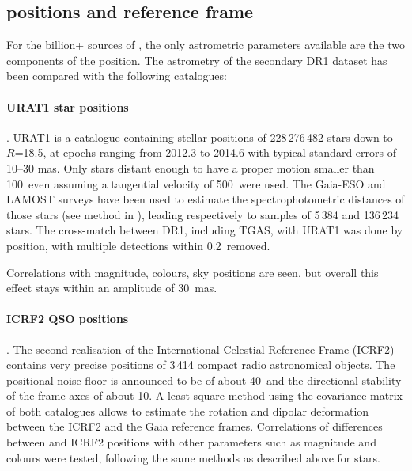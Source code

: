 \subsection{{} positions and reference frame}\label{sec:DR1pos}

For the billion+ sources of {}, the only astrometric parameters available are the two components of the position. The astrometry of the secondary DR1 dataset has been compared with the following catalogues:
 \paragraph{URAT1 star positions} \citep{urat1}. URAT1 is a catalogue containing stellar positions of 228\,276\,482 stars down to $R$=18.5, at epochs ranging from 2012.3 to 2014.6 with typical standard errors of 10--30 mas. Only stars distant enough to have a proper motion smaller than 100\masyr\ even assuming a tangential velocity of 500\kms\ were used. The Gaia-ESO and LAMOST surveys have been used to estimate the spectrophotometric distances of those stars (see method in ), leading respectively to samples of 5\,384 and 136\,234 stars. The cross-match between DR1, including TGAS, with URAT1 was done by position, with multiple detections within 0.2\arcsec~removed. 

Correlations with magnitude, colours, sky positions are seen, but overall this effect stays within an amplitude of 30~mas.

 \paragraph{ICRF2 QSO positions} \citep{2015AJ....150...58F}. The second realisation of the International Celestial Reference Frame (ICRF2) contains very precise positions of 3\,414 compact radio astronomical objects. The positional noise floor is announced to be  of about 40\muas ~and the directional stability of the frame axes of about 10\muas. A least-square method using the covariance matrix of both catalogues allows to estimate the rotation and dipolar deformation between the ICRF2 and the Gaia reference frames. Correlations of differences between {} and ICRF2 positions with other parameters such as magnitude and colours were tested, following the same methods as described above for stars. 

